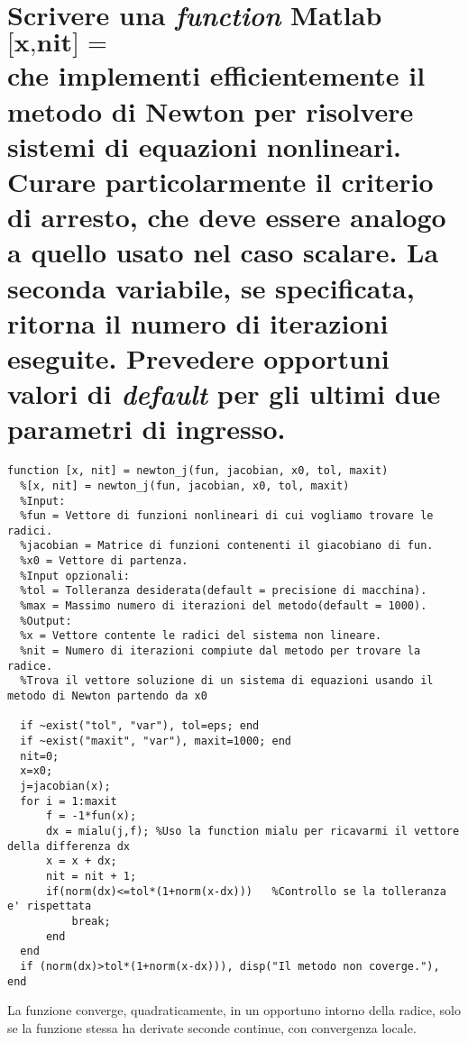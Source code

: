 \documentclass[10pt,a4paper]{article}
\begin{document}
\section{Scrivere una \textit{function} Matlab
  $$ \textbf{[x,nit] = newton(fun,jacobian,x0,tol,maxit)} $$
  che implementi efficientemente il metodo di Newton per risolvere sistemi di
  equazioni nonlineari. Curare particolarmente il criterio di arresto, che deve essere
  analogo a quello usato nel caso scalare.
  La seconda variabile, se specificata, ritorna il numero di iterazioni eseguite.
  Prevedere opportuni valori di \textit{default} per gli ultimi due parametri
  di ingresso.}
\begin{lstlisting}[style=Matlab-editor]
  function [x, nit] = newton_j(fun, jacobian, x0, tol, maxit)
  %[x, nit] = newton_j(fun, jacobian, x0, tol, maxit)
  %Input: 
  %fun = Vettore di funzioni nonlineari di cui vogliamo trovare le radici.
  %jacobian = Matrice di funzioni contenenti il giacobiano di fun. 
  %x0 = Vettore di partenza.
  %Input opzionali:
  %tol = Tolleranza desiderata(default = precisione di macchina).
  %max = Massimo numero di iterazioni del metodo(default = 1000).
  %Output:
  %x = Vettore contente le radici del sistema non lineare.
  %nit = Numero di iterazioni compiute dal metodo per trovare la radice.
  %Trova il vettore soluzione di un sistema di equazioni usando il metodo di Newton partendo da x0
  
  if ~exist("tol", "var"), tol=eps; end 
  if ~exist("maxit", "var"), maxit=1000; end
  nit=0;
  x=x0;
  j=jacobian(x);
  for i = 1:maxit
      f = -1*fun(x);
      dx = mialu(j,f); %Uso la function mialu per ricavarmi il vettore della differenza dx
      x = x + dx;
      nit = nit + 1;
      if(norm(dx)<=tol*(1+norm(x-dx)))   %Controllo se la tolleranza e' rispettata
          break;
      end
  end
  if (norm(dx)>tol*(1+norm(x-dx))), disp("Il metodo non coverge."), end
\end{lstlisting}

La funzione converge, quadraticamente, in un opportuno intorno della radice, solo se la funzione stessa ha derivate seconde continue,
con convergenza locale.
\end{document}
